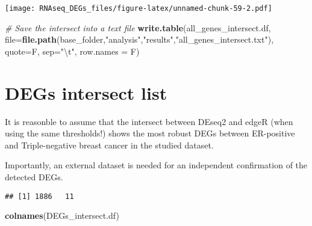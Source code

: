 \documentclass[]{book}
\newenvironment{Shaded}{\begin{snugshade}}{\end{snugshade}}
\newcommand{\KeywordTok}[1]{\textcolor[rgb]{0.13,0.29,0.53}{\textbf{#1}}}
\newcommand{\DataTypeTok}[1]{\textcolor[rgb]{0.13,0.29,0.53}{#1}}
\newcommand{\FloatTok}[1]{\textcolor[rgb]{0.00,0.00,0.81}{#1}}
\newcommand{\CharTok}[1]{\textcolor[rgb]{0.31,0.60,0.02}{#1}}
\newcommand{\StringTok}[1]{\textcolor[rgb]{0.31,0.60,0.02}{#1}}
\newcommand{\CommentTok}[1]{\textcolor[rgb]{0.56,0.35,0.01}{\textit{#1}}}
\newcommand{\OperatorTok}[1]{\textcolor[rgb]{0.81,0.36,0.00}{\textbf{#1}}}
\newcommand{\NormalTok}[1]{#1}
\begin{document}
\texttt{[image: RNAseq\_DEGs\_files/figure-latex/unnamed-chunk-59-2.pdf]}

\begin{Shaded}
\begin{Highlighting}[]
\CommentTok{# Save the intersect into a text file}
\KeywordTok{write.table}\NormalTok{(all_genes_intersect.df, }
            \DataTypeTok{file=}\KeywordTok{file.path}\NormalTok{(base_folder,}\StringTok{"analysis"}\NormalTok{,}\StringTok{"results"}\NormalTok{,}\StringTok{"all_genes_intersect.txt"}\NormalTok{),}
            \DataTypeTok{quote=}\NormalTok{F, }\DataTypeTok{sep=}\StringTok{"}\CharTok{\textbackslash{}t}\StringTok{"}\NormalTok{, }\DataTypeTok{row.names =}\NormalTok{ F)}
\end{Highlighting}
\end{Shaded}

\section{DEGs intersect list}\label{degs-intersect-list}

It is reasonble to assume that the intersect between DEseq2 and edgeR
(when using the same thresholds!) shows the most robust DEGs between
ER-positive and Triple-negative breast cancer in the studied dataset.

Importantly, an external dataset is needed for an independent
confirmation of the detected DEGs.

\begin{Shaded}
\end{Shaded}

\begin{verbatim}
## [1] 1886   11
\end{verbatim}

\begin{Shaded}
\begin{Highlighting}[]
\KeywordTok{colnames}\NormalTok{(DEGs_intersect.df)}
\end{Highlighting}
\end{Shaded}
\end{document}
